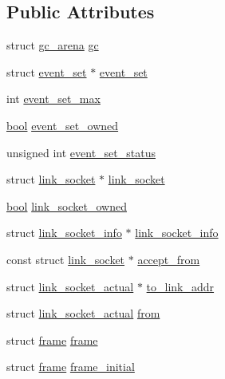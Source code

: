 \subsection*{Public Attributes}
\begin{DoxyCompactItemize}
\item 
struct \hyperlink{structgc__arena}{gc\+\_\+arena} \hyperlink{structcontext__2_ad4aeb5d46c4a32dc490a124af2c0770a}{gc}
\item 
struct \hyperlink{structevent__set}{event\+\_\+set} $\ast$ \hyperlink{structcontext__2_adc9eee8062fcb8d280910f28fcab8b0b}{event\+\_\+set}
\item 
int \hyperlink{structcontext__2_ad0ae63ac896195c2b4ae39385262b0c6}{event\+\_\+set\+\_\+max}
\item 
\hyperlink{automatic_8c_abb452686968e48b67397da5f97445f5b}{bool} \hyperlink{structcontext__2_afe17ff408cef993e5785dbb553851dce}{event\+\_\+set\+\_\+owned}
\item 
unsigned int \hyperlink{structcontext__2_a217331211c4964b53c8b7a2432a4216d}{event\+\_\+set\+\_\+status}
\item 
struct \hyperlink{structlink__socket}{link\+\_\+socket} $\ast$ \hyperlink{structcontext__2_aa779ad60c8e594706edf92faa2feda4f}{link\+\_\+socket}
\item 
\hyperlink{automatic_8c_abb452686968e48b67397da5f97445f5b}{bool} \hyperlink{structcontext__2_a666bfe66da6072618edc5a0f5688780f}{link\+\_\+socket\+\_\+owned}
\item 
struct \hyperlink{structlink__socket__info}{link\+\_\+socket\+\_\+info} $\ast$ \hyperlink{structcontext__2_a5a7d92871044e8e7ac72c09ef0508445}{link\+\_\+socket\+\_\+info}
\item 
const struct \hyperlink{structlink__socket}{link\+\_\+socket} $\ast$ \hyperlink{structcontext__2_a4cb8c7cbd964e80ede783143a456d44d}{accept\+\_\+from}
\item 
struct \hyperlink{structlink__socket__actual}{link\+\_\+socket\+\_\+actual} $\ast$ \hyperlink{structcontext__2_ab7d4ecafe432890ee5ca789aafec24c2}{to\+\_\+link\+\_\+addr}
\item 
struct \hyperlink{structlink__socket__actual}{link\+\_\+socket\+\_\+actual} \hyperlink{structcontext__2_a7c515ef01a7ece88dbcfa25129e47c9c}{from}
\item 
struct \hyperlink{structframe}{frame} \hyperlink{structcontext__2_a7bdb348860c0854ba0d834af8322c7d8}{frame}
\item 
struct \hyperlink{structframe}{frame} \hyperlink{structcontext__2_a1187d7900d4fcec429d30b7e5370d551}{frame\+\_\+initial}

\end{DoxyCompactItemize}
